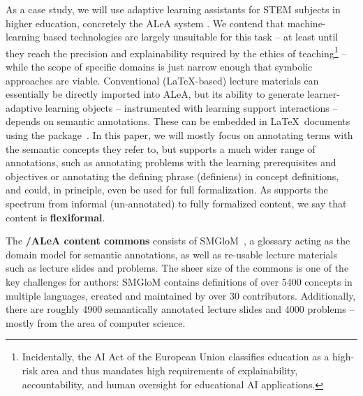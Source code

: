 \documentclass[runningheads]{llncs}
\newcommand\ALeA{\textsf{ALeA}\xspace}
\newcommand\SMGloM{\textsf{SMGloM}\xspace}
\begin{document}
As a case study, we will use adaptive learning assistants for STEM subjects in higher
education, concretely the \ALeA system \cite{BerBetChu:lssmkm23}.  We contend that
machine-learning based technologies are largely unsuitable for this task -- at least until
they reach the precision and explainability required by the ethics of
teaching\footnote{Incidentally, the AI Act of the European Union \cite{EUAIAct:on}
    classifies education as a high-risk area and thus mandates high requirements of
    explainability, accountability, and human oversight for educational AI applications.}
-- while the scope of specific domains is just narrow enough that symbolic approaches are
viable.  Conventional (\LaTeX-based) lecture materials can essentially be directly
imported into \ALeA, but its ability to generate learner-adaptive learning objects --
instrumented with learning support interactions -- depends on semantic annotations.  These
can be embedded in \LaTeX\ documents using the \sTeX
package~\cite{MueKo:sdstex22,sTeX:github:on}.  In this paper, we will mostly focus on
annotating terms with the semantic concepts they refer to, but \sTeX supports a much wider
range of annotations, such as annotating problems with the learning prerequisites
and objectives or annotating the defining phrase (definiens) in concept definitions,
and could, in principle, even be used for full formalization.  As \sTeX supports the
spectrum from informal (un-annotated) to fully formalized content, we say that \sTeX
content is \textbf{flexiformal}.

The \textbf{\sTeX/\ALeA content commons} consists of \SMGloM~\cite{GinIanJuc:spsttom16},
a glossary acting as the domain model for semantic annotations,
as well as re-usable lecture materials such as lecture slides and problems.
The sheer size
of the commons is one of the key challenges for authors: \SMGloM contains definitions of over
5400 concepts in multiple languages, created and maintained by over 30
contributors.  Additionally, there are roughly 4900
semantically annotated lecture slides and 4000 problems
-- mostly from the area of computer science.

% 
\end{document}
